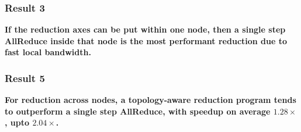 \documentclass[12pt,aspectratio=169]{beamer}
\begin{document}
    \begin{frame}
        \frametitle{Result 3}

        \textbf{If the reduction axes can be put within one node, then a single step AllReduce inside that node is the most
        performant reduction due to fast local bandwidth.}
    \end{frame}


    \begin{frame}
        \frametitle{Result 5}

        \textbf{For reduction across nodes, a topology-aware reduction program tends to outperform a single step
        AllReduce, with speedup on average $1.28\times$, upto $2.04\times$.}
    \end{frame}
\end{document}
